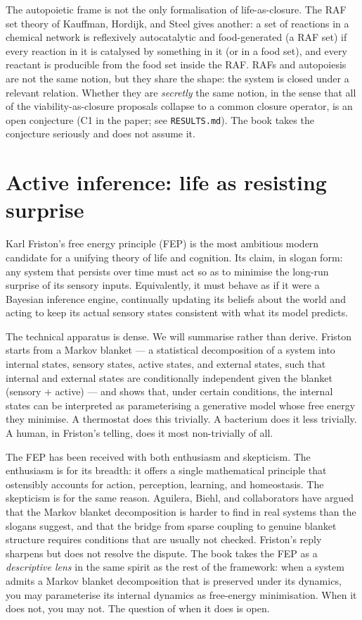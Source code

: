 The autopoietic frame is not the only formalisation of life-as-closure.
The RAF set theory of Kauffman, Hordijk, and Steel gives another: a set
of reactions in a chemical network is reflexively autocatalytic and
food-generated (a RAF set) if every reaction in it is catalysed by
something in it (or in a food set), and every reactant is producible
from the food set inside the RAF. RAFs and autopoiesis are not the same
notion, but they share the shape: the system is closed under a relevant
relation. Whether they are \emph{secretly} the same notion, in the sense
that all of the viability-as-closure proposals collapse to a common
closure operator, is an open conjecture (C1 in the paper; see
\texttt{RESULTS.md}). The book takes the conjecture seriously and does
not assume it.

\section{Active inference: life as resisting surprise}

Karl Friston's free energy principle (FEP) is the most ambitious modern
candidate for a unifying theory of life and cognition. Its claim, in
slogan form: any system that persists over time must act so as to minimise
the long-run surprise of its sensory inputs. Equivalently, it must behave
as if it were a Bayesian inference engine, continually updating its
beliefs about the world and acting to keep its actual sensory states
consistent with what its model predicts.

The technical apparatus is dense. We will summarise rather than derive.
Friston starts from a Markov blanket --- a statistical decomposition of a
system into internal states, sensory states, active states, and external
states, such that internal and external states are conditionally
independent given the blanket (sensory + active) --- and shows that, under
certain conditions, the internal states can be interpreted as
parameterising a generative model whose free energy they minimise. A
thermostat does this trivially. A bacterium does it less trivially. A
human, in Friston's telling, does it most non-trivially of all.

The FEP has been received with both enthusiasm and skepticism. The
enthusiasm is for its breadth: it offers a single mathematical principle
that ostensibly accounts for action, perception, learning, and
homeostasis. The skepticism is for the same reason. Aguilera, Biehl, and
collaborators have argued that the Markov blanket decomposition is harder
to find in real systems than the slogans suggest, and that the bridge
from sparse coupling to genuine blanket structure requires conditions
that are usually not checked. Friston's reply sharpens but does not
resolve the dispute. The book takes the FEP as a \emph{descriptive lens}
in the same spirit as the rest of the framework: when a system admits a
Markov blanket decomposition that is preserved under its dynamics, you
may parameterise its internal dynamics as free-energy minimisation. When
it does not, you may not. The question of when it does is open.

